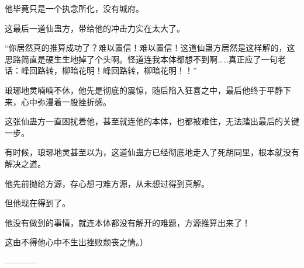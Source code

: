 \begin{this_body}
他毕竟只是一个执念所化，没有城府。

这最后一道仙蛊方，带给他的冲击力实在太大了。

“你居然真的推算成功了？难以置信！难以置信！这道仙蛊方居然是这样解的，这思路简直是硬生生地掉了个头啊。怪道连我本体都想不到啊……真正应了一句老话：峰回路转，柳暗花明！峰回路转，柳暗花明！！”

琅琊地灵喃喃不休，他先是彻底的震惊，随后陷入狂喜之中，最后他终于平静下来，心中弥漫着一股挫折感。

这张仙蛊方一直困扰着他，甚至就连他的本体，也都被难住，无法踏出最后的关键一步。

有时候，琅琊地灵甚至以为，这道仙蛊方已经彻底地走入了死胡同里，根本就没有解决之道。

他先前抛给方源，存心想刁难方源，从未想过得到真解。

但他现在得到了。

他没有做到的事情，就连本体都没有解开的难题，方源推算出来了！

这由不得他心中不生出挫败颓丧之情。）

------------

\end{this_body}

